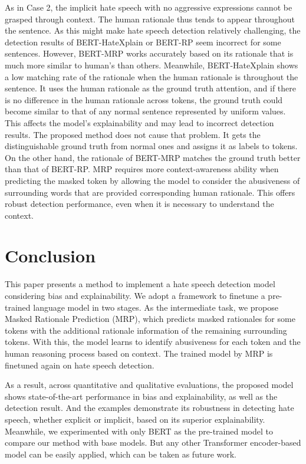\documentclass[11pt]{article}
\begin{document}
As in Case 2, the implicit hate speech with no aggressive expressions cannot be grasped through context. The human rationale thus tends to appear throughout the sentence. As this might make hate speech detection relatively challenging, the detection results of BERT-HateXplain or BERT-RP seem incorrect for some sentences. However, BERT-MRP works accurately based on its rationale that is much more similar to human's than others. Meanwhile, BERT-HateXplain shows a low matching rate of the rationale when the human rationale is throughout the sentence. It uses the human rationale as the ground truth attention, and if there is no difference in the human rationale across tokens, the ground truth could become similar to that of any normal sentence represented by uniform values. This affects the model's explainability and may lead to incorrect detection results. The proposed method does not cause that problem. It gets the distinguishable ground truth from normal ones and assigns it as labels to tokens.  
On the other hand, the rationale of BERT-MRP matches the ground truth better than that of BERT-RP. MRP requires more context-awareness ability when predicting the masked token by allowing the model to consider the abusiveness of surrounding words that are provided corresponding human rationale. This offers robust detection performance, even when it is necessary to understand the context.\\
\vspace{-0.3cm}
\section{Conclusion}
This paper presents a method to implement a hate speech detection model considering bias and explainability. We adopt a framework to finetune a pre-trained language model in two stages. As the intermediate task, we propose Masked Rationale Prediction (MRP), which predicts masked rationales for some tokens with the additional rationale information of the remaining surrounding tokens. With this, the model learns to identify abusiveness for each token and the human reasoning process based on context. The trained model by MRP is finetuned again on hate speech detection.  

As a result, across quantitative and qualitative evaluations, the proposed model shows state-of-the-art performance in bias and explainability, as well as the detection result. And the examples demonstrate its robustness in detecting hate speech, whether explicit or implicit, based on its superior explainability. Meanwhile, we experimented with only BERT as the pre-trained model to compare our method with base models. But any other Transformer encoder-based model can be easily applied, which can be taken as future work. \\
\end{document}
